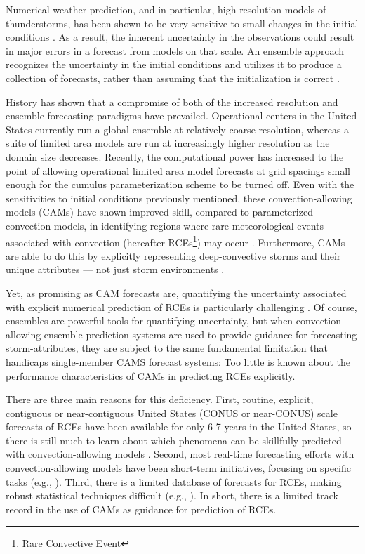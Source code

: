 Numerical weather prediction, and in particular, high-resolution models of thunderstorms, has been shown to be very sensitive to small changes in the initial conditions \citep{Lorenz1963, Lorenz1965, Lorenz1968, Brooks1992a, Brooks1992b}.
As a result, the inherent uncertainty in the observations could result in major errors in a forecast from models on that scale.
An ensemble approach recognizes the uncertainty in the initial conditions and utilizes it to produce a collection of forecasts, rather than assuming that the initialization is correct \citep{Brooks1992a}.


History has shown that a compromise of both of the increased resolution and ensemble forecasting paradigms have prevailed.
Operational centers in the United States currently run a global ensemble at relatively coarse resolution, whereas a suite of limited area models are run at increasingly higher resolution as the domain size decreases.
Recently, the computational power has increased to the point of allowing operational limited area model forecasts at grid spacings small enough for the cumulus parameterization scheme to be turned off.
Even with the sensitivities to initial conditions previously mentioned, these convection-allowing models (CAMs) have shown improved skill, compared to parameterized-convection models, in identifying regions where rare meteorological events associated with convection (hereafter RCEs\footnote{Rare Convective Event}) may occur \citep{Clark2010a}.
Furthermore, CAMs are able to do this by explicitly representing deep-convective storms and their unique attributes --- not just storm environments \citep{Kain2010}.


Yet, as promising as CAM forecasts are, quantifying the uncertainty associated with explicit numerical prediction of RCEs is particularly challenging \citep{Sobash2011}.
Of course, ensembles are powerful tools for quantifying uncertainty, but when convection-allowing ensemble prediction systems are used to provide guidance for forecasting storm-attributes, they are subject to the same fundamental limitation that handicaps single-member CAMS forecast systems: Too little is known about the performance characteristics of CAMs in predicting RCEs explicitly.


There are three main reasons for this deficiency.
First, routine, explicit, contiguous  or near-contiguous United States (CONUS or near-CONUS) scale forecasts of RCEs have been available for only 6-7 years in the United States, so there is still much to learn about which phenomena can be skillfully predicted with convection-allowing models \citep{Kain2008, Kain2010}.
Second, most real-time forecasting efforts with convection-allowing models have been short-term initiatives, focusing on specific tasks (e.g., \citealp{Done2004, Weisman2008}).
Third, there is a limited database of forecasts for RCEs, making robust statistical techniques difficult (e.g., \citealp{Hamill2006}).
In short, there is a limited track record in the use of CAMs as guidance for prediction of RCEs.


